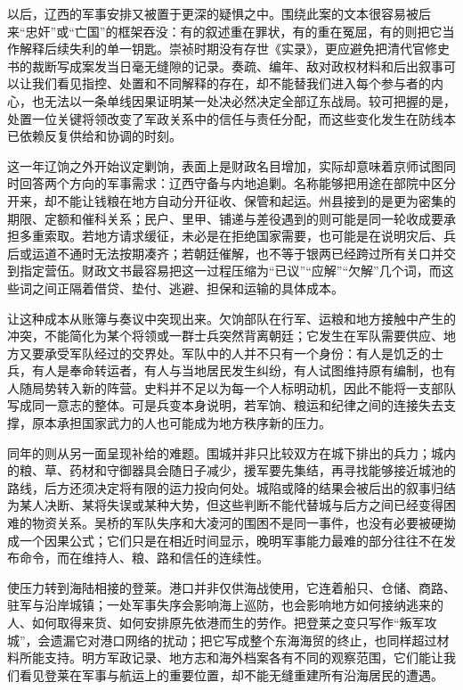 以后，辽西的军事安排又被置于更深的疑惧之中。围绕此案的文本很容易被后来“忠奸”或“亡国”的框架吞没：有的叙述重在罪状，有的重在冤屈，有的则把它当作解释后续失利的单一钥匙。崇祯时期没有存世《实录》，更应避免把清代官修史书的裁断写成案发当日毫无缝隙的记录。奏疏、编年、敌对政权材料和后出叙事可以让我们看见指控、处置和不同解释的存在，却不能替我们进入每个参与者的内心，也无法以一条单线因果证明某一处决必然决定全部辽东战局。较可把握的是，处置一位关键将领改变了军政关系中的信任与责任分配，而这些变化发生在防线本已依赖反复供给和协调的时刻。

这一年辽饷之外开始议定剿饷，表面上是财政名目增加，实际却意味着京师试图同时回答两个方向的军事需求：辽西守备与内地追剿。名称能够把用途在部院中区分开来，却不能让钱粮在地方自动分开征收、保管和起运。州县接到的是更为密集的期限、定额和催科关系；民户、里甲、铺递与差役遇到的则可能是同一轮收成要承担多重索取。若地方请求缓征，未必是在拒绝国家需要，也可能是在说明灾后、兵后或运道不通时无法按期凑齐；若朝廷催解，也不等于银两已经跨过所有关口并交到指定营伍。财政文书最容易把这一过程压缩为“已议”“应解”“欠解”几个词，而这些词之间正隔着借贷、垫付、逃避、担保和运输的具体成本。

让这种成本从账簿与奏议中突现出来。欠饷部队在行军、运粮和地方接触中产生的冲突，不能简化为某个将领或一群士兵突然背离朝廷；它发生在军队需要供应、地方又要承受军队经过的交界处。军队中的人并不只有一个身份：有人是饥乏的士兵，有人是奉命转运者，有人与当地居民发生纠纷，有人试图维持原有编制，也有人随局势转入新的阵营。史料并不足以为每一个人标明动机，因此不能将一支部队写成同一意志的整体。可是兵变本身说明，若军饷、粮运和纪律之间的连接失去支撑，原本承担国家武力的人也可能成为地方秩序新的压力。

同年的则从另一面呈现补给的难题。围城并非只比较双方在城下排出的兵力；城内的粮、草、药材和守御器具会随日子减少，援军要先集结，再寻找能够接近城池的路线，后方还须决定将有限的运力投向何处。城陷或降的结果会被后出的叙事归结为某人决断、某将失误或某种大势，但这些判断不能代替城与后方之间已经变得困难的物资关系。吴桥的军队失序和大凌河的围困不是同一事件，也没有必要被硬拗成一个因果公式；它们只是在相近时间显示，晚明军事能力最难的部分往往不在发布命令，而在维持人、粮、路和信任的连续性。

使压力转到海陆相接的登莱。港口并非仅供海战使用，它连着船只、仓储、商路、驻军与沿岸城镇；一处军事失序会影响海上巡防，也会影响地方如何接纳逃来的人、如何取得来货、如何安排原先依港而生的劳作。把登莱之变只写作“叛军攻城”，会遗漏它对港口网络的扰动；把它写成整个东海海贸的终止，也同样超过材料所能支持。明方军政记录、地方志和海外档案各有不同的观察范围，它们能让我们看见登莱在军事与航运上的重要位置，却不能无缝重建所有沿海居民的遭遇。

